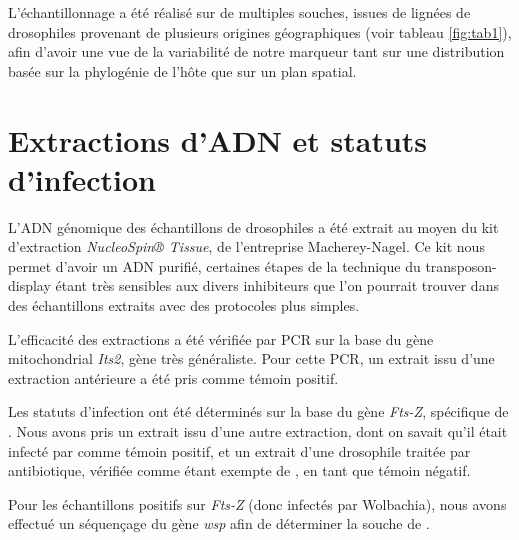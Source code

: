 	L'échantillonnage a été réalisé sur de multiples souches, issues de lignées de drosophiles provenant de plusieurs origines géographiques (voir tableau \ref{fig:tab1}), afin d'avoir une vue de la variabilité de notre marqueur tant sur une distribution basée sur la phylogénie de l'hôte que sur un plan spatial.



\section{Extractions d'ADN et statuts d'infection} %
L'ADN génomique des échantillons de drosophiles a été extrait au moyen du kit d'extraction \textit{NucleoSpin® Tissue}, de l'entreprise Macherey-Nagel.
Ce kit nous permet d'avoir un ADN purifié, certaines étapes de la technique du transposon-display étant très sensibles aux divers inhibiteurs que l'on pourrait trouver dans des échantillons extraits avec des protocoles plus simples.

L'efficacité des extractions a été vérifiée par PCR sur la base du gène mitochondrial \textit{Its2}, gène très généraliste. Pour cette PCR, un extrait issu d'une extraction antérieure a été pris comme témoin positif.

Les statuts d'infection ont été déterminés sur la base du gène \textit{Fts-Z}, spécifique de . Nous avons pris un extrait issu d'une autre extraction, dont on savait qu'il était infecté par  comme témoin positif, et un extrait d'une drosophile traitée par antibiotique, vérifiée comme étant exempte de , en tant que témoin négatif.

Pour les échantillons positifs sur \textit{Fts-Z} (donc infectés par Wolbachia), nous avons effectué un séquençage du gène \textit{wsp} afin de déterminer la souche de .

